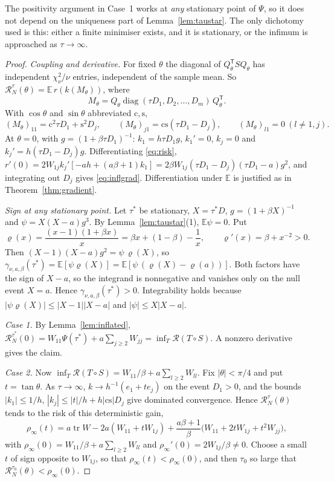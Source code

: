 \documentclass[11pt,a4paper]{article}
\numberwithin{equation}{section}
\theoremstyle{remark}\newtheorem{remark}[theorem]{Remark}
\newcommand{\E}{\mathbb E}
\newcommand{\tr}{\operatorname{tr}}
\newcommand{\diag}{\operatorname{diag}}
\newcommand{\risk}{\mathcal R}
\newcommand{\T}{^{\mathsf T}}
\begin{document}
The positivity argument in Case~1 works at \emph{any} stationary point of \(\Psi\), so it does
not depend on the uniqueness part of Lemma~\ref{lem:taustar}. The only dichotomy used is
this: either a finite minimiser exists, and it is stationary, or the infimum is approached as
\(\tau\to\infty\).

\begin{proof}
\emph{Coupling and derivative.} For fixed \(\theta\) the diagonal of \(Q_\theta\T SQ_\theta\) has
independent \(\chi^2_\nu/\nu\) entries, independent of the sample mean. So
\(\risk^{\tau}_N(\theta)=\E\,r(k(M_\theta))\), where
\[
 M_\theta=Q_\theta\diag(\tau D_1,D_2,\ldots,D_m)\,Q_\theta\T .
\] With \(\cos\theta\) and
\(\sin\theta\) abbreviated \(\mathrm c,\mathrm s\),
\[
 (M_\theta)_{11}=\mathrm c^2\tau D_1+\mathrm s^2D_j,\qquad
 (M_\theta)_{j1}=\mathrm{cs}(\tau D_1-D_j),\qquad (M_\theta)_{l1}=0\ (l\ne1,j).
\]
At \(\theta=0\), with \(g=(1+\beta\tau D_1)^{-1}\): \(k_1=h\tau D_1g\), \(k_1'=0\), \(k_j=0\) and
\(k_j'=h(\tau D_1-D_j)g\). Differentiating \eqref{eq:risk},
\(r'(0)=2W_{1j}k_j'[-ah+(a\beta+1)k_1]=2\beta W_{1j}(\tau D_1-D_j)(\tau D_1-a)g^2\), and
integrating out \(D_j\) gives \eqref{eq:inflgrad}. Differentiation under \(\E\) is justified as
in Theorem~\ref{thm:gradient}.

\emph{Sign at any stationary point.} Let \(\tau^*\) be stationary, \(X=\tau^*D\),
\(g=(1+\beta X)^{-1}\) and \(\psi=X(X-a)g^3\). By Lemma~\ref{lem:taustar}(1), \(\E\psi=0\). Put
\[
 \varrho(x)=\frac{(x-1)(1+\beta x)}{x}=\beta x+(1-\beta)-\frac1x,\qquad
 \varrho'(x)=\beta+x^{-2}>0 .
\]
Then \((X-1)(X-a)g^2=\psi\,\varrho(X)\), so
\(\gamma_{\nu,a,\beta}(\tau^*)=\E[\psi\varrho(X)]=\E[\psi\,(\varrho(X)-\varrho(a))]\).
Both factors have the sign of \(X-a\), so the integrand is nonnegative and vanishes only on
the null event \(X=a\). Hence \(\gamma_{\nu,a,\beta}(\tau^*)>0\). Integrability holds because
\(|\psi\varrho(X)|\le|X-1||X-a|\) and \(|\psi|\le X|X-a|\).

\emph{Case 1.} By Lemma~\ref{lem:inflated},
\(\risk^{\tau^*}_N(0)=W_{11}\Psi(\tau^*)+a\sum_{j\ge2}W_{jj}=\inf_T\risk(T\circ S)\). A nonzero
derivative gives the claim.

\emph{Case 2.} Now \(\inf_T\risk(T\circ S)=W_{11}/\beta+a\sum_{l\ge2}W_{ll}\). Fix
\(|\theta|<\pi/4\) and put \(t=\tan\theta\). As \(\tau\to\infty\), \(k\to h^{-1}(e_1+te_j)\) on the
event \(D_1>0\), and the bounds \(|k_1|\le1/h\), \(|k_j|\le|t|/h+h|\mathrm{cs}|D_j\) give dominated
convergence. Hence \(\risk^{\tau}_N(\theta)\) tends to the risk of this deterministic gain,
\[
 \rho_\infty(t)=a\tr W-2a(W_{11}+tW_{1j})+\frac{a\beta+1}{\beta}\bigl(W_{11}+2tW_{1j}+t^2W_{jj}\bigr),
\]
with \(\rho_\infty(0)=W_{11}/\beta+a\sum_{l\ge2}W_{ll}\) and \(\rho_\infty'(0)=2W_{1j}/\beta\ne0\).
Choose a small \(t\) of sign opposite to \(W_{1j}\), so that \(\rho_\infty(t)<\rho_\infty(0)\), and then
\(\tau_0\) so large that \(\risk^{\tau_0}_N(\theta)<\rho_\infty(0)\).
\end{proof}
\end{document}
